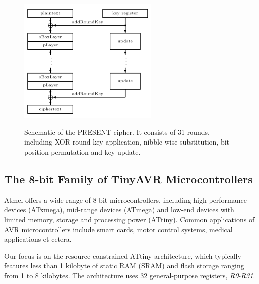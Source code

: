 \documentclass[11pt]{llncs2e} %
\begin{document}
\begin{figure}[H]
	\label{present_schematic}
	\centering
	 \includegraphics [width=0.6\textwidth]{present}
	 \\
\caption{\footnotesize Schematic of the PRESENT cipher. It consists of 31 rounds, including XOR round key application, nibble-wise substitution, bit position permutation and key update.}
\end{figure}
\subsection{The 8-bit Family of TinyAVR Microcontrollers}
Atmel offers a wide range of 8-bit microcontrollers, including high performance devices (ATxmega), mid-range devices (ATmega) and low-end devices with limited memory, storage and processing power (ATtiny). Common applications of AVR microcontrollers include smart cards, motor control systems, medical applications et cetera. 

Our focus is on the resource-constrained ATtiny architecture, which typically features less than 1 kilobyte of static RAM (SRAM) and flash storage ranging from 1 to 8 kilobytes. The architecture uses 32 general-purpose registers, \textit{R0}-\textit{R31}.
\end{document}
